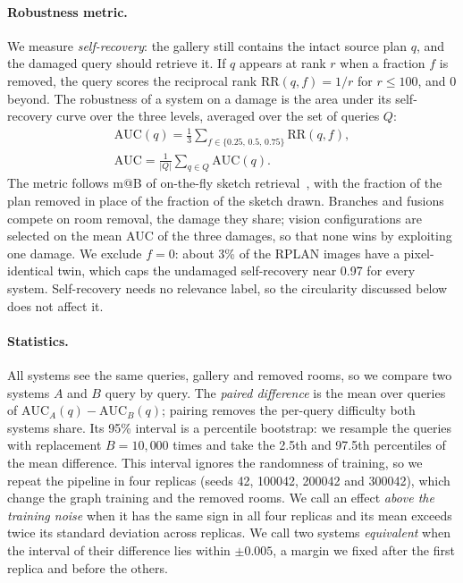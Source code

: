 \paragraph{Robustness metric.}
We measure \emph{self-recovery}: the gallery still contains the intact source plan $q$, and the damaged query should retrieve it.
If $q$ appears at rank $r$ when a fraction $f$ is removed, the query scores the reciprocal rank $\mathrm{RR}(q,f)=1/r$ for $r\le100$, and 0 beyond.
The robustness of a system on a damage is the area under its self-recovery curve over the three levels, averaged over the set of queries $Q$:
\begin{equation}
  \begin{gathered}
  \mathrm{AUC}(q)=\frac{1}{3}\sum_{f\in\{0.25,\,0.5,\,0.75\}}\mathrm{RR}(q,f),\\
  \mathrm{AUC}=\frac{1}{|Q|}\sum_{q\in Q}\mathrm{AUC}(q).
  \end{gathered}
  \label{eq:auc}
\end{equation}
The metric follows m@B of on-the-fly sketch retrieval~\cite{bhunia2020sketchless}, with the fraction of the plan removed in place of the fraction of the sketch drawn.
Branches and fusions compete on room removal, the damage they share; vision configurations are selected on the mean AUC of the three damages, so that none wins by exploiting one damage.
We exclude $f=0$: about 3\% of the RPLAN images have a pixel-identical twin, which caps the undamaged self-recovery near 0.97 for every system.
Self-recovery needs no relevance label, so the circularity discussed below does not affect it.

\paragraph{Statistics.}
All systems see the same queries, gallery and removed rooms, so we compare two systems $A$ and $B$ query by query.
The \emph{paired difference} is the mean over queries of $\mathrm{AUC}_A(q)-\mathrm{AUC}_B(q)$; pairing removes the per-query difficulty both systems share.
Its 95\% interval is a percentile bootstrap: we resample the queries with replacement $B=10{,}000$ times and take the 2.5th and 97.5th percentiles of the mean difference.
This interval ignores the randomness of training, so we repeat the pipeline in four replicas (seeds 42, 100042, 200042 and 300042), which change the graph training and the removed rooms.
We call an effect \emph{above the training noise} when it has the same sign in all four replicas and its mean exceeds twice its standard deviation across replicas.
We call two systems \emph{equivalent} when the interval of their difference lies within $\pm0.005$, a margin we fixed after the first replica and before the others.

